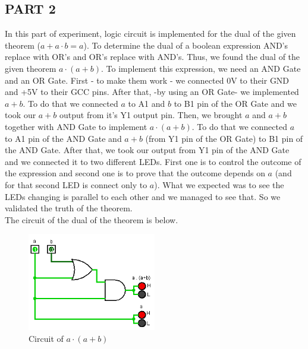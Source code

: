 \documentclass[pdftex,12pt,a4paper]{article}
\begin{document}
\subsection{PART 2}
In this part of experiment, logic circuit is implemented for the dual of the given theorem ($a + a \cdot b = a$). To determine the dual of a boolean expression AND's replace with OR's and OR's replace with AND's. Thus, we found the dual of the given theorem $a \cdot (a + b)$. To implement this expression, we need an AND Gate and an OR Gate. First - to make them work - we connected 0V to  their GND and +5V to their GCC pins. After that, -by using an OR Gate- we implemented $a + b$. To do that we connected $a$ to A1 and $b$ to B1 pin of the OR Gate and we took our $a + b$ output from it's Y1 output pin. Then, we brought $a$ and $a + b$ together with AND Gate to implement $a \cdot (a + b)$. To do that we connected $a$ to A1 pin of the AND Gate and $a + b$ (from Y1 pin of the OR Gate) to B1 pin of the AND Gate. After that, we took our output from Y1 pin of the AND Gate and we connected it to two different LEDs. First one is to control the outcome of the expression and second one is to prove that the outcome depends on $a$ (and for that second LED is connect only to $a$). What we expected was to see the LEDs changing is parallel to each other and we managed to see that. So we validated the truth of the theorem. \\

The circuit of the dual of the theorem is below.
\begin{figure}[ht]
	\centering
	\includegraphics[width=0.5\textwidth]{2_2.png}	
	\caption{Circuit of $a \cdot (a + b)$}
	\label{fig1}
\end{figure}
\end{document}
